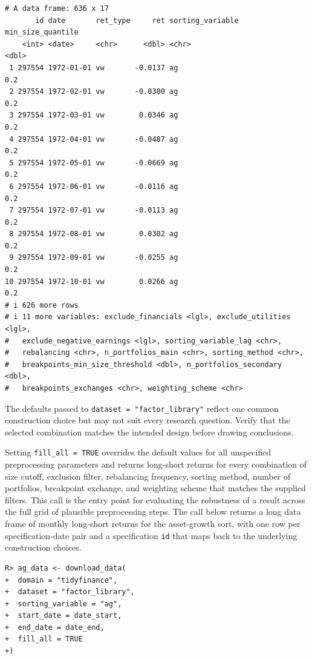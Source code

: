 \documentclass[
  article]{jss}
\begin{document}
\begin{verbatim}
# A data frame: 636 x 17
       id date       ret_type     ret sorting_variable min_size_quantile
    <int> <date>     <chr>      <dbl> <chr>                        <dbl>
 1 297554 1972-01-01 vw       -0.0137 ag                             0.2
 2 297554 1972-02-01 vw       -0.0300 ag                             0.2
 3 297554 1972-03-01 vw        0.0346 ag                             0.2
 4 297554 1972-04-01 vw       -0.0487 ag                             0.2
 5 297554 1972-05-01 vw       -0.0669 ag                             0.2
 6 297554 1972-06-01 vw       -0.0116 ag                             0.2
 7 297554 1972-07-01 vw       -0.0113 ag                             0.2
 8 297554 1972-08-01 vw        0.0302 ag                             0.2
 9 297554 1972-09-01 vw       -0.0255 ag                             0.2
10 297554 1972-10-01 vw        0.0266 ag                             0.2
# i 626 more rows
# i 11 more variables: exclude_financials <lgl>, exclude_utilities <lgl>,
#   exclude_negative_earnings <lgl>, sorting_variable_lag <chr>,
#   rebalancing <chr>, n_portfolios_main <chr>, sorting_method <chr>,
#   breakpoints_min_size_threshold <dbl>, n_portfolios_secondary <dbl>,
#   breakpoints_exchanges <chr>, weighting_scheme <chr>
\end{verbatim}

The defaults passed to \texttt{dataset\ =\ "factor\_library"} reflect
one common construction choice but may not suit every research question.
Verify that the selected combination matches the intended design before
drawing conclusions.

Setting \texttt{fill\_all\ =\ TRUE} overrides the default values for all
unspecified preprocessing parameters and returns long-short returns for
every combination of size cutoff, exclusion filter, rebalancing
frequency, sorting method, number of portfolios, breakpoint exchange,
and weighting scheme that matches the supplied filters. This call is the
entry point for evaluating the robustness of a result across the full
grid of plausible preprocessing steps. The call below returns a long
data frame of monthly long-short returns for the asset-growth sort, with
one row per specification-date pair and a specification \texttt{id} that
maps back to the underlying construction choices.

\begin{verbatim}
R> ag_data <- download_data(
+  domain = "tidyfinance",
+  dataset = "factor_library",
+  sorting_variable = "ag",
+  start_date = date_start,
+  end_date = date_end,
+  fill_all = TRUE
+)
\end{verbatim}
\end{document}
